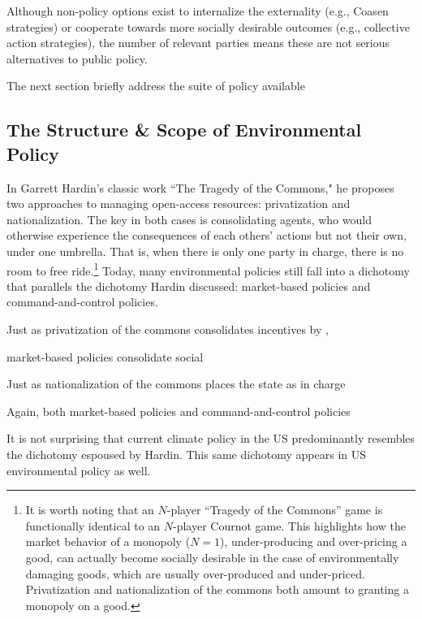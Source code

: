 Although non-policy options exist to internalize the externality (e.g., Coasen strategies) or cooperate towards more socially desirable outcomes (e.g., collective action strategies), the number of relevant parties means these are not serious alternatives to public policy. 

The next section briefly address the suite of policy available 


\subsection{The Structure \& Scope of Environmental Policy}

In Garrett Hardin's classic work ``The Tragedy of the Commons,"  he proposes two approaches to managing open-access resources: privatization and nationalization. The key in both cases is consolidating agents, who would otherwise experience the consequences of each others' actions but not their own, under one umbrella. That is, when there is only one party in charge, there is no room to free ride.\footnote{It is worth noting that an $N$-player ``Tragedy of the Commons'' game is functionally identical to an $N$-player Cournot game. This highlights how the market behavior of a monopoly ($N =1$), under-producing and over-pricing a good, can actually become socially desirable in the case of environmentally damaging goods, which are usually over-produced and under-priced. Privatization and nationalization of the commons both amount to granting a monopoly on a good.} Today, many environmental policies still fall into a dichotomy that parallels the dichotomy Hardin discussed: market-based policies and command-and-control policies. 




Just as privatization of the commons consolidates incentives by , 

market-based policies consolidate social 

Just as nationalization of the commons places the state as in charge 

Again, both market-based policies and command-and-control policies 







It is not surprising that current climate policy in the US predominantly resembles the dichotomy espoused by Hardin. This same dichotomy appears in US environmental policy as well.




